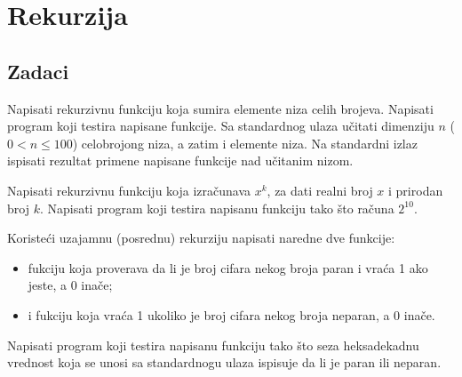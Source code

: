 
\chapter{Rekurzija}

\section{Zadaci}

\begin{Exercise}[label=101]
Napisati rekurzivnu funkciju koja sumira elemente niza celih brojeva.  Napisati program koji testira napisane funkcije. Sa standardnog ulaza učitati dimenziju $n$  ($0 < n \leq 100$) celobrojong
niza, a zatim i elemente niza. Na standardni izlaz ispisati
rezultat primene napisane funkcije nad učitanim
nizom.
\end{Exercise}
\begin{Answer}[ref=101]
\end{Answer}

\begin{Exercise}[label=102]
 Napisati rekurzivnu funkciju koja izračunava  $x^k$,  za dati realni broj $x$ i prirodan broj $k$. Napisati program koji testira napisanu funkciju tako što računa $2^{10}$.
\end{Exercise}
\begin{Answer}[ref=102]
\end{Answer}

\begin{Exercise}[label=104]
 Koristeći uzajamnu (posrednu) rekurziju napisati naredne dve funkcije:
 \begin{itemize}
\item fukciju  koja proverava da li je broj cifara nekog broja paran i vraća 1 ako jeste, a 0 inače;
\item i fukciju  koja vraća 1 ukoliko je broj cifara nekog broja neparan, a 0 inače.
 \end{itemize}
 Napisati program koji testira napisanu funkciju tako što seza heksadekadnu vrednost koja se unosi sa standardnogu ulaza ispisuje da li je paran ili neparan.
\end{Exercise}
\begin{Answer}[ref=104]
\end{Answer}

